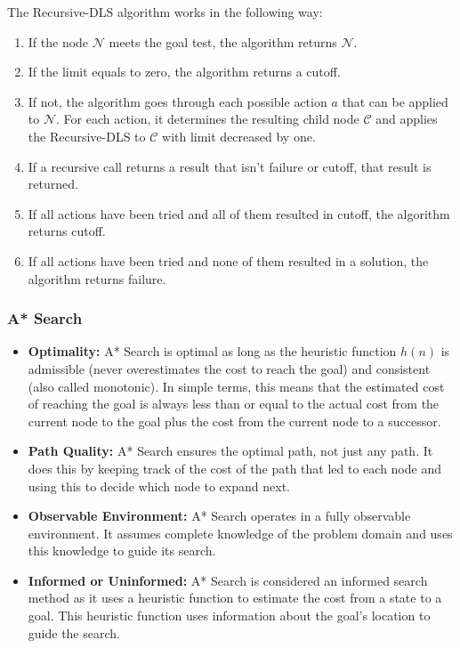 \documentclass[a4paper,UKenglish,cleveref, autoref, thm-restate]{qlinhta}
\begin{document}
    The Recursive-DLS algorithm works in the following way:
    \begin{enumerate}
        \item If the node $\mathcal{N}$ meets the goal test, the algorithm returns $\mathcal{N}$.
        \item If the limit equals to zero, the algorithm returns a cutoff.
        \item If not, the algorithm goes through each possible action $a$ that can be applied to $\mathcal{N}$. For each action, it determines the resulting child node $\mathcal{C}$ and applies the Recursive-DLS to $\mathcal{C}$ with limit decreased by one.
        \item If a recursive call returns a result that isn't failure or cutoff, that result is returned.
        \item If all actions have been tried and all of them resulted in cutoff, the algorithm returns cutoff.
        \item If all actions have been tried and none of them resulted in a solution, the algorithm returns failure.
    \end{enumerate}

    \subsubsection{A* Search}

    \begin{itemize}
        \item \textbf{Optimality:} A* Search is optimal as long as the heuristic function $h(n)$ is admissible (never overestimates the cost to reach the goal) and consistent (also called monotonic). In simple terms, this means that the estimated cost of reaching the goal is always less than or equal to the actual cost from the current node to the goal plus the cost from the current node to a successor.
        \item \textbf{Path Quality:} A* Search ensures the optimal path, not just any path. It does this by keeping track of the cost of the path that led to each node and using this to decide which node to expand next.
        \item \textbf{Observable Environment:} A* Search operates in a fully observable environment. It assumes complete knowledge of the problem domain and uses this knowledge to guide its search.
        \item \textbf{Informed or Uninformed:} A* Search is considered an informed search method as it uses a heuristic function to estimate the cost from a state to a goal. This heuristic function uses information about the goal's location to guide the search.
    \end{itemize}
\end{document}

